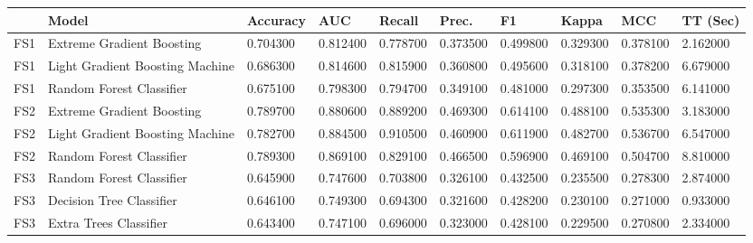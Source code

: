 ﻿\begin{table}[!ht]
    \centering
    \begin{tabular}{|l|l|l|l|l|l|l|l|l|l|}
    \hline
        ~ & Model & Accuracy & AUC & Recall & Prec. & F1 & Kappa & MCC & TT (Sec) \\ \hline
        FS1 & Extreme Gradient Boosting & 0.704300 & 0.812400 & 0.778700 & 0.373500 & 0.499800 & 0.329300 & 0.378100 & 2.162000 \\ \hline
        FS1 & Light Gradient Boosting Machine & 0.686300 & 0.814600 & 0.815900 & 0.360800 & 0.495600 & 0.318100 & 0.378200 & 6.679000 \\ \hline
        FS1 & Random Forest Classifier & 0.675100 & 0.798300 & 0.794700 & 0.349100 & 0.481000 & 0.297300 & 0.353500 & 6.141000 \\ \hline
        FS2 & Extreme Gradient Boosting & 0.789700 & 0.880600 & 0.889200 & 0.469300 & 0.614100 & 0.488100 & 0.535300 & 3.183000 \\ \hline
        FS2 & Light Gradient Boosting Machine & 0.782700 & 0.884500 & 0.910500 & 0.460900 & 0.611900 & 0.482700 & 0.536700 & 6.547000 \\ \hline
        FS2 & Random Forest Classifier & 0.789300 & 0.869100 & 0.829100 & 0.466500 & 0.596900 & 0.469100 & 0.504700 & 8.810000 \\ \hline
        FS3 & Random Forest Classifier & 0.645900 & 0.747600 & 0.703800 & 0.326100 & 0.432500 & 0.235500 & 0.278300 & 2.874000 \\ \hline
        FS3 & Decision Tree Classifier & 0.646100 & 0.749300 & 0.694300 & 0.321600 & 0.428200 & 0.230100 & 0.271000 & 0.933000 \\ \hline
        FS3 & Extra Trees Classifier & 0.643400 & 0.747100 & 0.696000 & 0.323000 & 0.428100 & 0.229500 & 0.270800 & 2.334000 \\ \hline
    \end{tabular}
\end{table}
